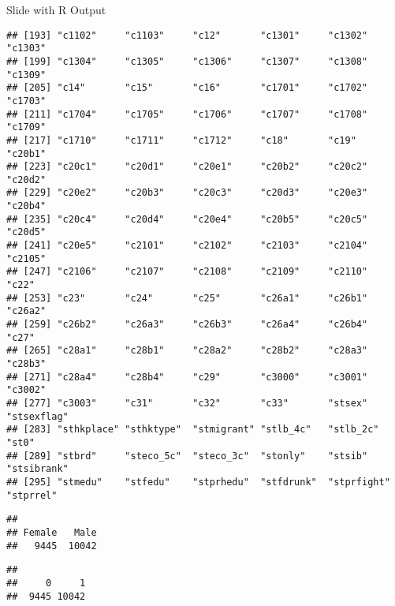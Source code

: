 \documentclass[
  ignorenonframetext,
]{beamer}
\newenvironment{Shaded}{\begin{snugshade}}{\end{snugshade}}
\newcommand{\AttributeTok}[1]{\textcolor[rgb]{0.13,0.29,0.53}{#1}}
\newcommand{\DecValTok}[1]{\textcolor[rgb]{0.00,0.00,0.81}{#1}}
\newcommand{\FunctionTok}[1]{\textcolor[rgb]{0.13,0.29,0.53}{\textbf{#1}}}
\newcommand{\NormalTok}[1]{#1}
\newcommand{\OtherTok}[1]{\textcolor[rgb]{0.56,0.35,0.01}{#1}}
\newcommand{\SpecialCharTok}[1]{\textcolor[rgb]{0.81,0.36,0.00}{\textbf{#1}}}
\newcommand{\StringTok}[1]{\textcolor[rgb]{0.31,0.60,0.02}{#1}}
\begin{document}
\begin{frame}[fragile]{Slide with R Output}
\begin{verbatim}
## [193] "c1102"     "c1103"     "c12"       "c1301"     "c1302"     "c1303"    
## [199] "c1304"     "c1305"     "c1306"     "c1307"     "c1308"     "c1309"    
## [205] "c14"       "c15"       "c16"       "c1701"     "c1702"     "c1703"    
## [211] "c1704"     "c1705"     "c1706"     "c1707"     "c1708"     "c1709"    
## [217] "c1710"     "c1711"     "c1712"     "c18"       "c19"       "c20b1"    
## [223] "c20c1"     "c20d1"     "c20e1"     "c20b2"     "c20c2"     "c20d2"    
## [229] "c20e2"     "c20b3"     "c20c3"     "c20d3"     "c20e3"     "c20b4"    
## [235] "c20c4"     "c20d4"     "c20e4"     "c20b5"     "c20c5"     "c20d5"    
## [241] "c20e5"     "c2101"     "c2102"     "c2103"     "c2104"     "c2105"    
## [247] "c2106"     "c2107"     "c2108"     "c2109"     "c2110"     "c22"      
## [253] "c23"       "c24"       "c25"       "c26a1"     "c26b1"     "c26a2"    
## [259] "c26b2"     "c26a3"     "c26b3"     "c26a4"     "c26b4"     "c27"      
## [265] "c28a1"     "c28b1"     "c28a2"     "c28b2"     "c28a3"     "c28b3"    
## [271] "c28a4"     "c28b4"     "c29"       "c3000"     "c3001"     "c3002"    
## [277] "c3003"     "c31"       "c32"       "c33"       "stsex"     "stsexflag"
## [283] "sthkplace" "sthktype"  "stmigrant" "stlb_4c"   "stlb_2c"   "st0"      
## [289] "stbrd"     "steco_5c"  "steco_3c"  "stonly"    "stsib"     "stsibrank"
## [295] "stmedu"    "stfedu"    "stprhedu"  "stfdrunk"  "stprfight" "stprrel"
\end{verbatim}

\begin{Shaded}
\end{Shaded}

\begin{verbatim}
## 
## Female   Male 
##   9445  10042
\end{verbatim}

\begin{Shaded}
\end{Shaded}

\begin{verbatim}
## 
##     0     1 
##  9445 10042
\end{verbatim}
\end{frame}
\end{document}
